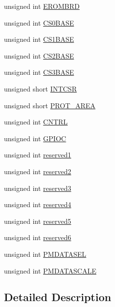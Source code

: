 \begin{CompactItemize}
unsigned int \hyperlink{struct_pci9030_local_conf_e09a3ce001edf7b515717ca2b15dbe8d}{EROMBRD}
\item 
unsigned int \hyperlink{struct_pci9030_local_conf_fe4767e14f663d7a001d9ca2077de9e8}{CS0BASE}
\item 
unsigned int \hyperlink{struct_pci9030_local_conf_5534ac4d99c87f6c5bf9c7ae32470bff}{CS1BASE}
\item 
unsigned int \hyperlink{struct_pci9030_local_conf_5bc7f14fd02d0148520086aa958d8d61}{CS2BASE}
\item 
unsigned int \hyperlink{struct_pci9030_local_conf_6a18709959d62d7938926f7e51c3ae6d}{CS3BASE}
\item 
unsigned short \hyperlink{struct_pci9030_local_conf_bf5e1c5bcc3eca40ef7e17268538c16e}{INTCSR}
\item 
unsigned short \hyperlink{struct_pci9030_local_conf_86e45b8c8a309f0710433c9752c94392}{PROT\_\-AREA}
\item 
unsigned int \hyperlink{struct_pci9030_local_conf_1627b4c057c764efd4ba2f457bb6e849}{CNTRL}
\item 
unsigned int \hyperlink{struct_pci9030_local_conf_f75dbe512f25a1363528ff596e00bccb}{GPIOC}
\item 
unsigned int \hyperlink{struct_pci9030_local_conf_334ab05104ad1d45a3170a45a2686871}{reserved1}
\item 
unsigned int \hyperlink{struct_pci9030_local_conf_fd857d368f0aa6258819d7d9b09d12f0}{reserved2}
\item 
unsigned int \hyperlink{struct_pci9030_local_conf_a490a2efaeef3f76654abdfb4eb0d633}{reserved3}
\item 
unsigned int \hyperlink{struct_pci9030_local_conf_b05a13461c3fdfdfa464bd2f5814dcbc}{reserved4}
\item 
unsigned int \hyperlink{struct_pci9030_local_conf_f81ba16c81cdcac43a37b72ab8491d10}{reserved5}
\item 
unsigned int \hyperlink{struct_pci9030_local_conf_258eb4c536f5c5cb073b330af2059e58}{reserved6}
\item 
unsigned int \hyperlink{struct_pci9030_local_conf_4fa1a09a088c5d964349d53ff58cc8d5}{PMDATASEL}
\item 
unsigned int \hyperlink{struct_pci9030_local_conf_ad5372a8b2e30a778cd6ca906f41aaff}{PMDATASCALE}
\end{CompactItemize}


\subsection{Detailed Description}


